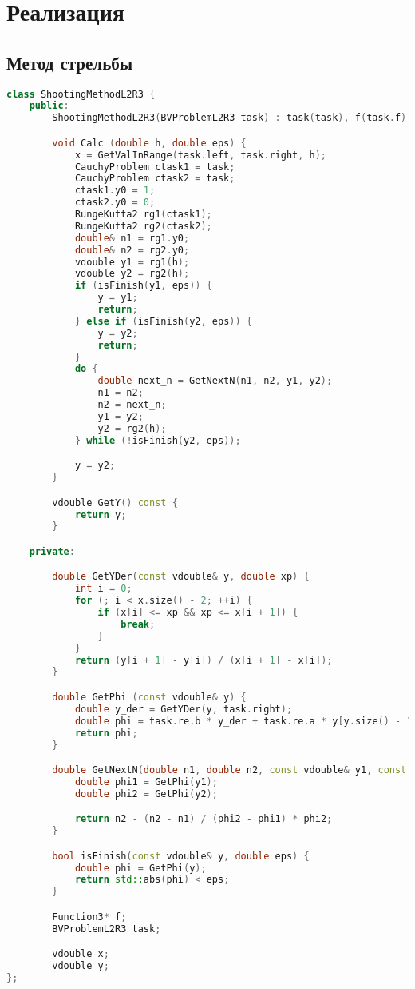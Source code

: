 \section*{Реализация}

\subsection*{Метод стрельбы}

\begin{lstlisting}[language=C++]
class ShootingMethodL2R3 {
    public:
        ShootingMethodL2R3(BVProblemL2R3 task) : task(task), f(task.f) {}

        void Calc (double h, double eps) {
            x = GetValInRange(task.left, task.right, h);
            CauchyProblem ctask1 = task;
            CauchyProblem ctask2 = task;
            ctask1.y0 = 1;
            ctask2.y0 = 0;
            RungeKutta2 rg1(ctask1);
            RungeKutta2 rg2(ctask2);
            double& n1 = rg1.y0;
            double& n2 = rg2.y0;
            vdouble y1 = rg1(h);
            vdouble y2 = rg2(h);
            if (isFinish(y1, eps)) {
                y = y1;
                return;
            } else if (isFinish(y2, eps)) {
                y = y2;
                return;
            }
            do {
                double next_n = GetNextN(n1, n2, y1, y2);
                n1 = n2;
                n2 = next_n;
                y1 = y2;
                y2 = rg2(h);
            } while (!isFinish(y2, eps));

            y = y2;
        }

        vdouble GetY() const {
            return y;
        }

    private:

        double GetYDer(const vdouble& y, double xp) {
            int i = 0;
            for (; i < x.size() - 2; ++i) {
                if (x[i] <= xp && xp <= x[i + 1]) {
                    break;
                }
            }
            return (y[i + 1] - y[i]) / (x[i + 1] - x[i]);
        }

        double GetPhi (const vdouble& y) {
            double y_der = GetYDer(y, task.right);
            double phi = task.re.b * y_der + task.re.a * y[y.size() - 1] - task.re.c;
            return phi;
        }

        double GetNextN(double n1, double n2, const vdouble& y1, const vdouble& y2) {
            double phi1 = GetPhi(y1);
            double phi2 = GetPhi(y2);

            return n2 - (n2 - n1) / (phi2 - phi1) * phi2;
        }

        bool isFinish(const vdouble& y, double eps) {
            double phi = GetPhi(y);
            return std::abs(phi) < eps;
        }

        Function3* f;
        BVProblemL2R3 task;

        vdouble x;
        vdouble y;
};
\end{lstlisting}

